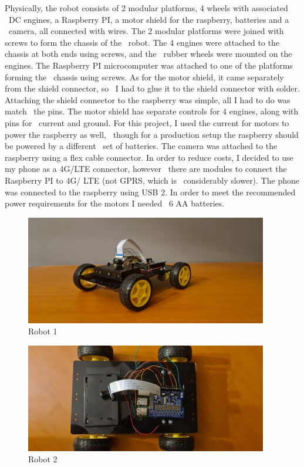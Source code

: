 Physically, the robot consists of 2 modular platforms, 4 wheels with associated \
DC engines, a Raspberry PI, a motor shield for the raspberry, batteries and a \
camera, all connected with wires.
The 2 modular platforms were joined with screws to form the chassis of the \
robot.
The 4 engines were attached to the chassis at both ends using screws, and the \
rubber wheels were mounted on the engines.
The Raspberry PI microcomputer was attached to one of the platforms forming the \
chassis using screws.
As for the motor shield, it came separately from the shield connector, so \
I had to glue it to the shield connector with solder.
Attaching the shield connector to the raspberry was simple, all I had to do was match \
the pins.
The motor shield has separate controls for 4 engines, along with pins for \
current and ground.
For this project, I used the current for motors to power the raspberry as well, \
though for a production setup the raspberry should be powered by a different \
set of batteries.
The camera was attached to the raspberry using a flex cable connector.
In order to reduce costs, I decided to use my phone as a 4G/LTE connector, however \
there are modules to connect the Raspberry PI to 4G/ LTE (not GPRS, which is \
considerably slower).
The phone was connected to the raspberry using USB 2.
In order to meet the recommended power requirements for the motors I needed \
6 AA batteries.

\begin{figure}[ht]
    \label{fig:robot1}
    \includegraphics[keepaspectratio]{img/robot1b.jpg}
    \caption{Robot 1}
\end{figure}

\begin{figure}[ht]
    \label{fig:robot2}
    \includegraphics[keepaspectratio]{img/robot2b.jpg}
    \caption{Robot 2}
\end{figure}


